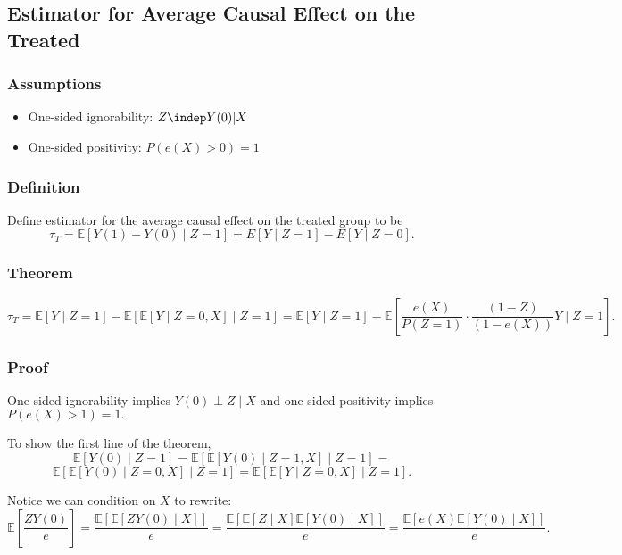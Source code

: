 \subsection{Estimator for Average Causal Effect on the Treated}

\subsubsection{Assumptions}

\begin{itemize}
    \item One-sided ignorability: $Z \indep Y(0) | X$
    \item One-sided positivity: $P(e(X) > 0) = 1$
\end{itemize}

\subsubsection{Definition}

Define estimator for the average causal effect on the treated group to be $$\tau_{T} = \mathbb{E}[Y(1) - Y(0) \mid Z = 1] = E[Y \mid Z = 1] - E[Y \mid Z = 0].$$

\subsubsection{Theorem}

$$\tau_T = \mathbb{E}[Y \mid Z = 1] - \mathbb{E}[\mathbb{E}[Y \mid Z = 0, X] \mid Z = 1] = \mathbb{E}[Y \mid Z = 1] - \mathbb{E}\left[\frac{e(X)}{P(Z=1)} \cdot \frac{(1-Z)}{(1-e(X))} Y \mid Z = 1\right].$$

\subsubsection{Proof}

One-sided ignorability implies $Y(0) \perp Z \mid X$ and one-sided positivity implies $P(e(X) > 1) = 1.$

\noindent To show the first line of the theorem, $$\mathbb{E}[Y(0) \mid Z = 1] = \mathbb{E}[\mathbb{E}[Y(0) \mid Z = 1, X] \mid Z = 1] = $$
$$\mathbb{E}[\mathbb{E}[Y(0) \mid Z = 0, X] \mid Z = 1] = \mathbb{E}[\mathbb{E}[Y \mid Z = 0, X] \mid Z = 1].$$

\noindent Notice we can condition on $X$ to rewrite: 
$$\mathbb{E}\left[\frac{ZY(0)}{e}\right] = \frac{\mathbb{E}\left[\mathbb{E}[ZY(0) \mid X]\right]}{e} = \frac{\mathbb{E}\left[\mathbb{E}[Z \mid X]\mathbb{E}[Y(0) \mid X]\right]}{e} = \frac{\mathbb{E}\left[e(X)\mathbb{E}[Y(0) \mid X]\right]}{e}.$$

